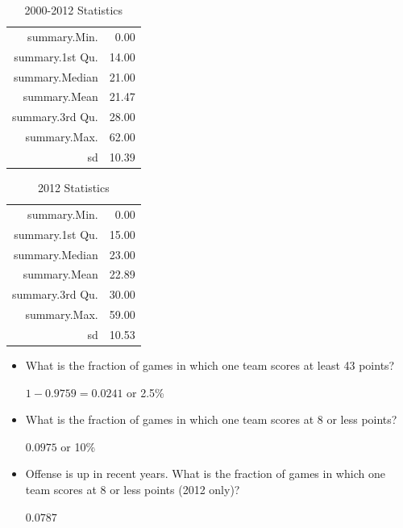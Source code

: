 \documentclass{exam}
\begin{document}
  \begin{table}[H]
    \centering
    \begin{tabular}{rr}
      \toprule
      summary.Min.    & 0.00 \\
      summary.1st Qu. & 14.00 \\
      summary.Median  & 21.00 \\
      summary.Mean    & 21.47 \\
      summary.3rd Qu. & 28.00 \\
      summary.Max.    & 62.00 \\
      sd              & 10.39 \\
      \bottomrule
    \end{tabular}
    \caption{2000-2012 Statistics}
  \end{table}

  \begin{table}[H]
    \centering
    \begin{tabular}{rr}
      \toprule
      summary.Min. & 0.00 \\ 
      summary.1st Qu. & 15.00 \\ 
      summary.Median & 23.00 \\ 
      summary.Mean & 22.89 \\ 
      summary.3rd Qu. & 30.00 \\ 
      summary.Max. & 59.00 \\ 
      sd & 10.53 \\ 
      \bottomrule
    \end{tabular}
    \caption{2012 Statistics}
  \end{table}

  \begin{itemize}
    \item What is the fraction of games in which one team scores at least 43 points?
      \begin{solution}
        $1 - 0.9759 = 0.0241$ or 2.5\%
      \end{solution}

    \item What is the fraction of games in which one team scores at 8 or less points?
      \begin{solution}
        $0.0975$ or 10\%
      \end{solution}

    \item Offense is up in recent years.  What is the fraction of games in which one
      team scores at 8 or less points (2012 only)?
      \begin{solution}
        $0.0787$
      \end{solution}
  \end{itemize}
\end{document}
